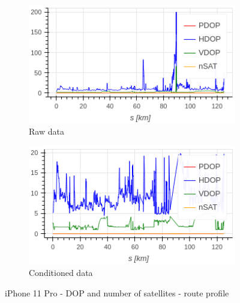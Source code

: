\documentclass{article}
\begin{document}
			\begin{figure}[h]
		   		\centering
		     	\begin{subfigure}[b]{0.45\textwidth}
		      		\centering
		      	   \includegraphics[width=\textwidth]{raw_dop_0.png}
		      	   \caption{Raw data}
		      	   \label{fig:iPhone_raw_dop}
		     	\end{subfigure}
		     	\begin{subfigure}[b]{0.45\textwidth}
		      	   \centering
		      	   \includegraphics[width=\textwidth]{cond_dop_0.png}
		      	   \caption{Conditioned data}
		      	   \label{fig:iPhone_cond_dop}
		     	\end{subfigure}
		      \caption{iPhone 11 Pro - DOP and number of satellites - route profile}
		      \label{fig:iPhone_dop}
			\end{figure}
\end{document}
